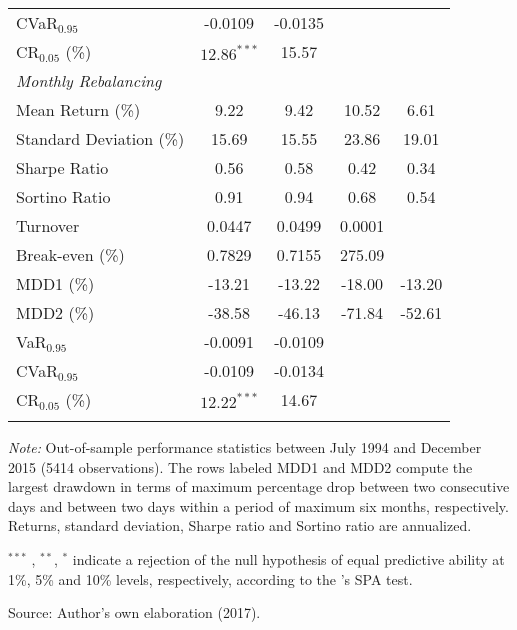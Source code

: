 \documentclass[a4paper,12pt]{report}
\begin{document}
\begin{threeparttable}[H]
\begin{tabularx}{\textwidth}{@{\extracolsep{\fill}}lcccc@{}}
		CVaR$_{0.95}$ & -0.0109 & -0.0135 &  & \\
		CR$_{0.05}$ (\%) & $12.86^{***}$ & 15.57 &  &  \\
		\midrule[\heavyrulewidth] \textit{Monthly Rebalancing} &  &  &  &  \\
		\midrule[\heavyrulewidth] Mean Return (\%) & 9.22 & 9.42 & 10.52 & 6.61
		\\
		Standard Deviation (\%) & 15.69 & 15.55 & 23.86 & 19.01 \\
		Sharpe Ratio & 0.56 & 0.58 & 0.42 & 0.34 \\
		Sortino Ratio & 0.91 & 0.94 & 0.68 & 0.54 \\
		Turnover & 0.0447 & 0.0499 & 0.0001 &  \\
		Break-even (\%) &  0.7829 & 0.7155 & 275.09 &  \\
		MDD1 (\%) & -13.21 & -13.22 & -18.00 & -13.20 \\
		MDD2 (\%) & -38.58 & -46.13 & -71.84 & -52.61 \\
		VaR$_{0.95}$ &  -0.0091 & -0.0109 &  &  \\
		CVaR$_{0.95}$ & -0.0109 & -0.0134 &  &  \\
		CR$_{0.05}$ (\%) & $12.22^{***}$ & 14.67 &  &  \\
		\bottomrule &  &  &  &
	\end{tabularx}%
	\begin{tablenotes}
		\item \textit{Note:} \scriptsize Out-of-sample performance statistics between July 1994 and December 2015 (5414 observations). The rows labeled MDD1 and MDD2 compute the largest drawdown in terms of maximum percentage drop between two consecutive days and between two days within a period of maximum six months, respectively. Returns, standard deviation, Sharpe ratio and Sortino ratio are annualized.
		\item \scriptsize $^{\ast\ast\ast}$ , $^{\ast\ast}$, $^{\ast}$ indicate a rejection of the null hypothesis of equal predictive ability at 1\%, 5\% and 10\% levels, respectively, according to the \citet*{hansen2005test}'s SPA test.
		\item Source: Author's own elaboration (2017).
		
	\end{tablenotes}
	\label{tab:table01}%
\end{threeparttable}

\vspace{0.3cm}
\end{document}
